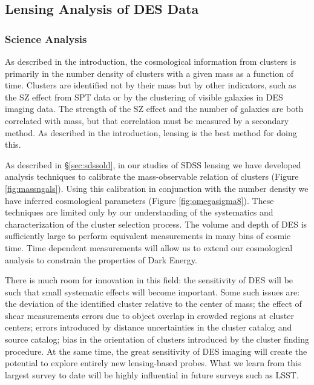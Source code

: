 \documentclass[12pt]{article}
\begin{document}
\subsection{Lensing Analysis of DES Data} \label{sec:deslensing}

\subsubsection{Science Analysis}

As described in the introduction, the cosmological information from clusters is
primarily in the number density of clusters with a given mass as a function of
time.  Clusters are identified not by their mass but by other indicators, such
as the SZ effect from SPT data or by the clustering of visible galaxies in DES
imaging data.  The strength of the SZ effect and the number of galaxies are
both correlated with mass, but that correlation must be measured by a secondary
method.  As described in the introduction, lensing is the best method for doing
this.  

As described in \S\ref{sec:sdssold}, in our studies of SDSS lensing we have
developed analysis techniques to calibrate the mass-observable relation of
clusters (Figure \ref{fig:massngals}).  Using this calibration in conjunction
with the number density we have inferred cosmological parameters (Figure
\ref{fig:omegasigma8}).  These techniques are limited only by our understanding
of the systematics and characterization of the cluster selection process.  The
volume and depth of DES is sufficiently large to perform equivalent
measurements in many bins of cosmic time.  Time dependent measurements will
allow us to extend our cosmological analysis to constrain the properties of
Dark Energy.

There is much room for innovation in this field: the sensitivity of DES will be
such that small systematic effects will become important. Some such issues are:
the deviation of the identified cluster relative to the center of mass; the
effect of shear measurements errors due to object overlap in crowded regions at
cluster centers; errors introduced by distance uncertainties in the cluster
catalog and source catalog; bias in the orientation of clusters introduced by
the cluster finding procedure.  At the same time, the great sensitivity of DES
imaging will create the potential to explore entirely new lensing-based probes.
What we learn from this largest survey to date will be highly influential in
future surveys such as LSST.
\end{document}
